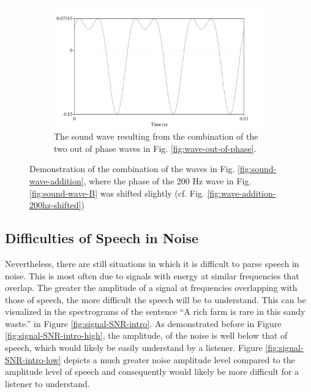 \begin{figure}[H]
\begin{center}
\begin{subfigure}{0.5\textwidth}
  \includegraphics[width=\textwidth]{figure/sound-combined-shifted-phase.png}
  \caption{The sound wave resulting from the combination of the two out of phase waves in Fig. \ref{fig:wave-out-of-phase}.}
  \label{fig:sound-combined-shifted-phase}
\end{subfigure}
\end{center}
\caption{Demonstration of the combination of the waves in Fig. \ref{fig:sound-wave-addition}, where the phase of the 200 Hz wave in Fig. \ref{fig:sound-wave-B} was shifted slightly (cf. Fig. \ref{fig:wave-addition-200hz-shifted})}
\label{fig:sound-shifted-phase}
\end{figure}



\subsection{Difficulties of Speech in Noise}\label{sec:snr-difficult}

Nevertheless, there are still situations in which it is difficult to parse speech in noise.  This is most often due to signals with energy at similar frequencies that overlap.  The greater the amplitude of a signal at frequencies overlapping with those of speech, the more difficult the speech will be to understand.  This can be visualized in the spectrograms of the sentence ``A rich farm is rare in this sandy waste.'' in Figure \ref{fig:signal-SNR-intro}.  As demonstrated before in Figure \ref{fig:signal-SNR-intro-high}, the amplitude, of the noise is well below that of speech, which would likely be easily understand by a listener.  Figure \ref{fig:signal-SNR-intro-low} depicts a much greater noise amplitude level compared to the amplitude level of speech and consequently would likely be more difficult for a listener to understand.

